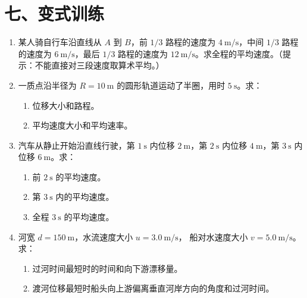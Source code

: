 \section*{七、变式训练}

\begin{enumerate}
  \item 某人骑自行车沿直线从 $A$ 到 $B$，前 $1/3$ 路程的速度为 $4\ \mathrm{m/s}$，中间 $1/3$ 路程的速度为 $6\ \mathrm{m/s}$，最后 $1/3$ 路程的速度为 $12\ \mathrm{m/s}$。求全程的平均速度。（提示：不能直接对三段速度取算术平均。）

  \item 一质点沿半径为 $R = 10\ \mathrm{m}$ 的圆形轨道运动了半圈，用时 $5\ \mathrm{s}$。求：
  \begin{center}
  
  \end{center}
  \begin{enumerate}
    \item 位移大小和路程。
    \item 平均速度大小和平均速率。
  \end{enumerate}

  \item 汽车从静止开始沿直线行驶，第 $1\ \mathrm{s}$ 内位移 $2\ \mathrm{m}$，第 $2\ \mathrm{s}$ 内位移 $4\ \mathrm{m}$，第 $3\ \mathrm{s}$ 内位移 $6\ \mathrm{m}$。求：
  \begin{enumerate}
    \item 前 $2\ \mathrm{s}$ 的平均速度。
    \item 第 $3\ \mathrm{s}$ 内的平均速度。
    \item 全程 $3\ \mathrm{s}$ 的平均速度。
  \end{enumerate}

  \item 河宽 $d=150\ \mathrm m$，水流速度大小 $u=3.0\ \mathrm{m/s}$，
  船对水速度大小 $v=5.0\ \mathrm{m/s}$。求：
  \begin{enumerate}
    \item 过河时间最短时的时间和向下游漂移量。
    \item 渡河位移最短时船头向上游偏离垂直河岸方向的角度和过河时间。
  \end{enumerate}
\end{enumerate}

